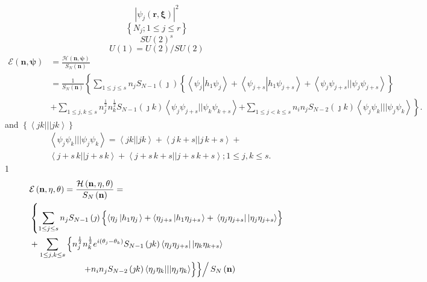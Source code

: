 \documentclass[aps,preprint]{revtex4}%
\begin{document}
\[
\left\vert \psi_{j}\left(  \mathbf{r,\xi}\right)  \right\vert ^{2}%
\]%
\[
\left\{  N_{j};1\leq j\leq r\right\}
\]%
\[
SU(2)^{s}%
\]%
\[
U(1)=U(2)/SU(2)
\]%
\begin{align*}
\mathcal{E}\left(  \mathbf{n,\psi}\right)   &  =\frac{\mathcal{H}\left(
\mathbf{n,\psi}\right)  }{S_{N}\left(  \mathbf{n}\right)  }\\
&  =\frac{1}{S_{N}\left(  \mathbf{n}\right)  }\left\{  \sum_{1\leq j\leq
s}n_{j}S_{N-1}\left(  \jmath\right)  \left\{  \left\langle \psi_{j}\left\vert
h_{1}\psi_{j}\right.  \right\rangle +\left\langle \psi_{j+s}\left\vert
h_{1}\psi_{j+s}\right.  \right\rangle +\left\langle \psi_{j}\psi_{j+s}%
||\psi_{j}\psi_{j+s}\right\rangle \right\}  \right. \\
&  +\sum_{1\leq j,k\leq s}n_{j}^{\frac{1}{2}}n_{k}^{\frac{1}{2}}S_{N-1}\left(
\jmath k\right)  \left\langle \psi_{j}\psi_{j+s}||\psi_{k}\psi_{k+s}%
\right\rangle \left.  +\sum_{1\leq j<k\leq s}n_{i}n_{j}S_{N-2}\left(  \jmath
k\right)  \left\langle \psi_{j}\psi_{k}|||\psi_{j}\psi_{k}\right\rangle
\right\}  .
\end{align*}
and $\left\{  \left\langle jk|||jk\right\rangle \right\}  $
\begin{align*}
&  \left\langle \psi_{j}\psi_{k}|||\psi_{j}\psi_{k}\right\rangle =\left\langle
jk||jk\right\rangle +\left\langle j\,k+s||j\,k+s\right\rangle +\\
&  \left\langle j+s\,k||j+s\,k\right\rangle +\left\langle
j+s\,k+s||j+s\,k+s\right\rangle ;1\leq j,k\leq s.
\end{align*}
1%
\begin{align*}
&  \mathcal{E}\left(  \mathbf{n},\mathbf{\eta},\mathbf{\theta}\right)
=\frac{\mathcal{H}\left(  \mathbf{n},\mathbf{\eta},\mathbf{\theta}\right)
}{S_{N}\left(  \mathbf{n}\right)  }=\\
&  \left\{  \sum_{1\leq j\leq s}n_{j}S_{N-1}\left(  \jmath\right)  \left\{
\overset{}{\left\langle \eta_{j}\left\vert h_{1}\eta_{j}\right.  \right\rangle
+\left\langle \eta_{j+s}\left\vert h_{1}\eta_{j+s}\right.  \right\rangle
}+\,\left\langle \eta_{j}\eta_{j+s}\right\vert \left\vert \eta_{j}\eta
_{j+s}\right\rangle \right\}  \right. \\
&  +\sum_{1\leq j,k\leq s}\left\{  n_{j}^{\frac{1}{2}}n_{k}^{\frac{1}{2}%
}e^{i\left(  \theta_{j}-\theta_{k}\right)  }S_{N-1}\left(  \jmath k\right)
\left\langle \eta_{j}\eta_{j+s}\right\vert \left\vert \eta_{k}\eta
_{k+s}\right\rangle \right. \\
&  \qquad\qquad\qquad\left.  \left.  \left.  +\overset{}{n_{i}n_{j}%
S_{N-2}\left(  \jmath k\right)  \left\langle \eta_{j}\eta_{k}|||\eta_{j}%
\eta_{k}\right\rangle }\right\}  \right\}  \right/  S_{N}\left(
\mathbf{n}\right)
\end{align*}%
\end{document}
